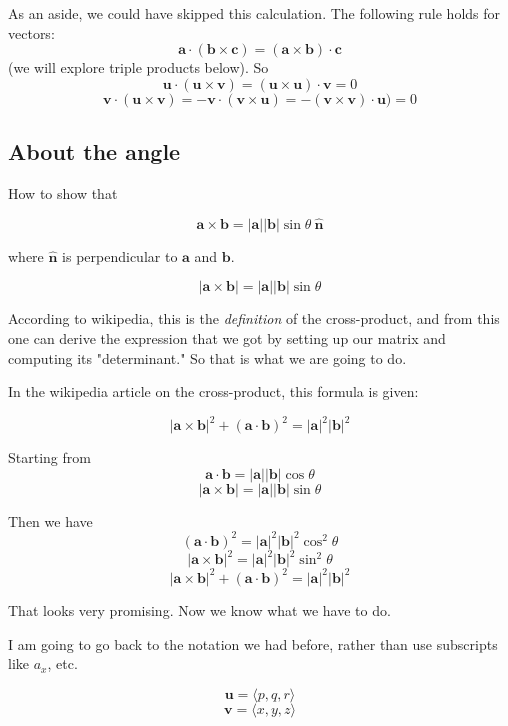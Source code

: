 \documentclass[11pt, oneside]{report}   	%
\begin{document}
As an aside, we could have skipped this calculation.  The following rule holds for vectors:
\[ \mathbf{a} \cdot ( \mathbf{b} \times \mathbf{c} ) = ( \mathbf{a} \times \mathbf{b} ) \cdot \mathbf{c} \]
(we will explore triple products below).
So
\[ \mathbf{u} \cdot (\mathbf{u} \times \mathbf{v}) = (\mathbf{u} \times \mathbf{u}) \cdot \mathbf{v} = 0 \]
\[ \mathbf{v} \cdot (\mathbf{u} \times \mathbf{v}) = - \mathbf{v} \cdot (\mathbf{v} \times \mathbf{u}) = - (\mathbf{v} \times \mathbf{v}) \cdot \mathbf{u}) = 0 \]

\subsection*{About the angle}

How to show that

\[ \mathbf{a} \times \mathbf{b} = |\mathbf{a}| |\mathbf{b}| \sin \theta \ \hat{\mathbf{n}}  \]

where $\hat{\mathbf{n}}$ is perpendicular to $\mathbf{a}$ and $\mathbf{b}$.

\[ |\mathbf{a} \times \mathbf{b} | = |\mathbf{a}| |\mathbf{b}| \sin \theta \]

According to wikipedia, this is the \emph{definition} of the cross-product, and from this one can derive the expression that we got by setting up our matrix and computing its "determinant."  So that is what we are going to do.


In the wikipedia article on the cross-product, this formula is given:

\[ | \mathbf{a} \times \mathbf{b} |^2 + (\mathbf{a} \cdot \mathbf{b})^2 = |\mathbf{a}|^2 |\mathbf{b}|^2 \]

Starting from 
\[ \mathbf{a} \cdot \mathbf{b}  = |\mathbf{a}| |\mathbf{b}| \cos \theta \]
\[ |\mathbf{a} \times \mathbf{b} | = |\mathbf{a}| |\mathbf{b}| \sin \theta \]

Then we have
\[ (\mathbf{a} \cdot \mathbf{b} )^2 = |\mathbf{a}|^2 |\mathbf{b}|^2 \cos^2 \theta \]
\[ |\mathbf{a} \times \mathbf{b} |^2 = |\mathbf{a}|^2 |\mathbf{b}|^2 \sin^2 \theta \]
\[ | \mathbf{a} \times \mathbf{b} |^2 + (\mathbf{a} \cdot \mathbf{b})^2 = |\mathbf{a}|^2 |\mathbf{b}|^2 \]

That looks very promising.  Now we know what we have to do.

I am going to go back to the notation we had before, rather than use subscripts like $a_x$, etc.

\[ \mathbf{u} = \langle p,q,r \rangle \]
\[ \mathbf{v} = \langle x,y,z \rangle \]
\end{document}
